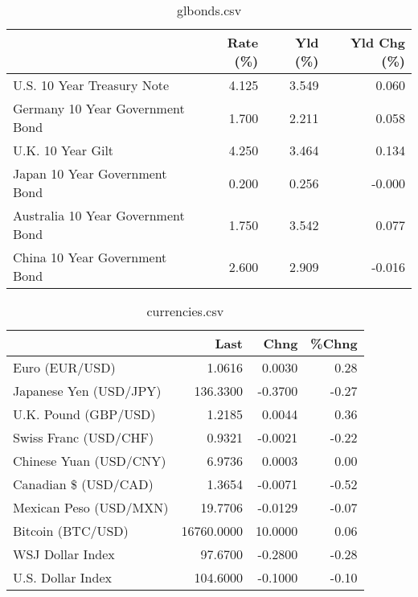 \documentclass{article}%
\begin{document}
%


\begin{table}[htbp]%
\caption{glbonds.csv}%
\centering%
\begin{adjustbox}{width=1\textwidth}%
\begin{tabular}{lrrr}
\toprule
                                  &  Rate (\%) &  Yld (\%) &  Yld Chg (\%) \\
\midrule
       U.S. 10 Year Treasury Note &     4.125 &    3.549 &        0.060 \\
  Germany 10 Year Government Bond &     1.700 &    2.211 &        0.058 \\
                U.K. 10 Year Gilt &     4.250 &    3.464 &        0.134 \\
    Japan 10 Year Government Bond &     0.200 &    0.256 &       -0.000 \\
Australia 10 Year Government Bond &     1.750 &    3.542 &        0.077 \\
    China 10 Year Government Bond &     2.600 &    2.909 &       -0.016 \\
\bottomrule
\end{tabular}
%
\end{adjustbox}%
\end{table}

%


\begin{table}[htbp]%
\caption{currencies.csv}%
\centering%
\begin{adjustbox}{width=1\textwidth}%
\begin{tabular}{lrrr}
\toprule
                       &       Last &    Chng &  \%Chng \\
\midrule
        Euro (EUR/USD) &     1.0616 &  0.0030 &   0.28 \\
Japanese Yen (USD/JPY) &   136.3300 & -0.3700 &  -0.27 \\
  U.K. Pound (GBP/USD) &     1.2185 &  0.0044 &   0.36 \\
 Swiss Franc (USD/CHF) &     0.9321 & -0.0021 &  -0.22 \\
Chinese Yuan (USD/CNY) &     6.9736 &  0.0003 &   0.00 \\
  Canadian \$ (USD/CAD) &     1.3654 & -0.0071 &  -0.52 \\
Mexican Peso (USD/MXN) &    19.7706 & -0.0129 &  -0.07 \\
     Bitcoin (BTC/USD) & 16760.0000 & 10.0000 &   0.06 \\
      WSJ Dollar Index &    97.6700 & -0.2800 &  -0.28 \\
     U.S. Dollar Index &   104.6000 & -0.1000 &  -0.10 \\
\bottomrule
\end{tabular}
%
\end{adjustbox}%
\end{table}

%
\end{document}
